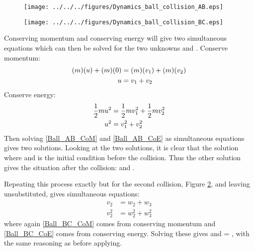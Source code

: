 \begin{problem}[A1969AMIIQ8l]
{\begin{figure}[h]
  \centering
 	\texttt{[image: ../../../figures/Dynamics\_ball\_collision\_AB.eps]}
	\caption{}
	\label{fig:Dynamics_ball_collision_AB}
\end{figure}
\begin{figure}[h]
	\centering
	\texttt{[image: ../../../figures/Dynamics\_ball\_collision\_BC.eps]}
	\caption{}
	\label{fig:Dynamics_ball_collision_BC}
\caption{}
\end{figure}

Conserving momentum and conserving energy will give two simultaneous equations which can then be solved for the two unknowns  and .
Conserve momentum:
\begin{align} \notag 
(m)(u) + (m)(0) &= (m)(v_{1}) + (m)(v_{2}) \\ u &= v_{1} + v_{2} \label{Ball_AB_CoM}
\end{align}
Conserve energy:
\begin{align} \notag 
\frac{1}{2}mu^{2} &= \frac{1}{2}mv_{1}^{2} + \frac{1}{2}mv_{2}^{2} \\ u^{2} &= v_{1}^{2} + v_{2}^{2} \label{Ball_AB_CoE}
\end{align}
Then solving \ref{Ball_AB_CoM} and \ref{Ball_AB_CoE} as simultaneous equations gives two solutions. Looking at the two solutions, it is clear that the solution where  and  is the initial condition before the collision. Thus the other solution gives the situation after the collision:  and .

Repeating this process exactly but for the second collision, Figure \ref{fig:Dynamics_ball_collision_BC}, and leaving  unsubstituted, gives simultaneous equations:
\begin{align} 
v_{2} &= w_{2} + w_{3} \label{Ball_BC_CoM} \\  
v_{2}^{2} &= w_{2}^{2} + w_{3}^{2} \label{Ball_BC_CoE}
\end{align}
where again \ref{Ball_BC_CoM} comes from conserving momentum and \ref{Ball_BC_CoE} comes from conserving energy. Solving these gives  and  = , with the same reasoning as before applying.

}
\end{problem}
